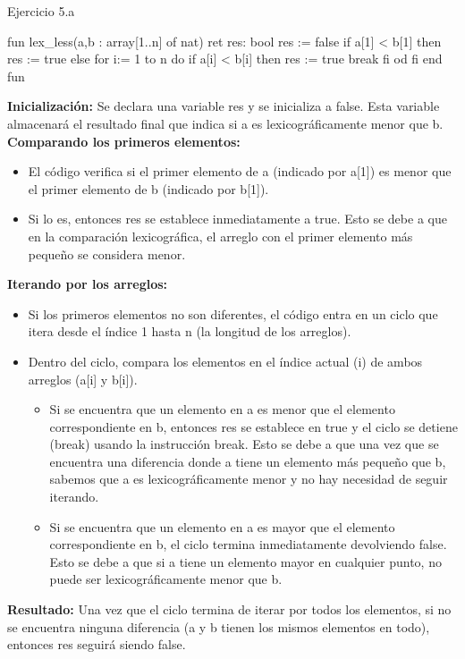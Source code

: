 \begin{codebox}{Ejercicio 5.a}
\begin{pascallike}
fun lex_less(a,b : array[1..n] of nat) ret res: bool
    res := false
    if a[1] < b[1] then
        res := true
    else
        for i:= 1 to n do
            if a[i] < b[i] then
                res := true
                break
            fi
        od
    fi
end fun
\end{pascallike}
\end{codebox}
\textbf{Inicialización:} Se declara una variable res y se inicializa a false. Esta variable almacenará el resultado final que indica si a es lexicográficamente menor que b.
\textbf{Comparando los primeros elementos:} 
\begin{itemize}
    \item El código verifica si el primer elemento de a (indicado por a[1]) es menor que el primer elemento de b (indicado por b[1]).
    \item Si lo es, entonces res se establece inmediatamente a true. Esto se debe a que en la comparación lexicográfica, el arreglo con el primer elemento más pequeño se considera menor.
\end{itemize}
\textbf{Iterando por los arreglos:} 
\begin{itemize}
    \item Si los primeros elementos no son diferentes, el código entra en un ciclo que itera desde el índice 1 hasta n (la longitud de los arreglos).
    \item Dentro del ciclo, compara los elementos en el índice actual (i) de ambos arreglos (a[i] y b[i]).
    \begin{itemize}
        \item Si se encuentra que un elemento en a es menor que el elemento correspondiente en b, entonces res se establece en true y el ciclo se detiene (break) usando la instrucción break. Esto se debe a que una vez que se encuentra una diferencia donde a tiene un elemento más pequeño que b, sabemos que a es lexicográficamente menor y no hay necesidad de seguir iterando.
        \item Si se encuentra que un elemento en a es mayor que el elemento correspondiente en b, el ciclo termina inmediatamente devolviendo false. Esto se debe a que si a tiene un elemento mayor en cualquier punto, no puede ser lexicográficamente menor que b.
    \end{itemize}
\end{itemize}
\textbf{Resultado:} Una vez que el ciclo termina de iterar por todos los elementos, si no se encuentra ninguna diferencia (a y b tienen los mismos elementos en todo), entonces res seguirá siendo false.

